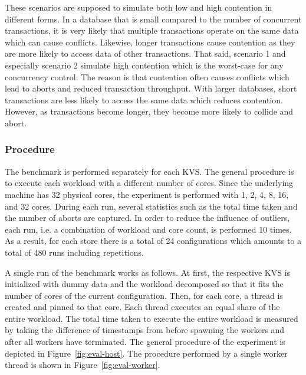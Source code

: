 These scenarios are supposed to simulate both low and high contention in
different forms. In a database that is small compared to the number of
concurrent transactions, it is very likely that multiple transactions operate on
the same data which can cause conflicts. Likewise, longer transactions cause
contention as they are more likely to access data of other transactions. That
said, scenario 1 and especially scenario 2 simulate high contention which is the
worst-case for any concurrency control. The reason is that contention often
causes conflicts which lead to aborts and reduced transaction throughput. With
larger databases, short transactions are less likely to access the same data
which reduces contention. However, as transactions become longer, they become
more likely to collide and abort.

\subsubsection{Procedure}

The benchmark is performed separately for each KVS. The general procedure is to
execute each workload with a different number of cores. Since the underlying
machine has 32 physical cores, the experiment is performed with 1, 2, 4, 8, 16,
and 32 cores. During each run, several statistics such as the total time taken
and the number of aborts are captured. In order to reduce the influence of
outliers, each run, i.e. a combination of workload and core count, is performed
10 times. As a result, for each store there is a total of 24 configurations
which amounts to a total of 480 runs including repetitions.

A single run of the benchmark works as follows. At first, the respective KVS is
initialized with dummy data and the workload decomposed so that it fits the
number of cores of the current configuration. Then, for each core, a thread is
created and pinned to that core. Each thread executes an equal share of the
entire workload. The total time taken to execute the entire workload is measured
by taking the difference of timestamps from before spawning the workers and
after all workers have terminated. The general procedure of the experiment is
depicted in Figure~\ref{fig:eval-host}. The procedure performed by a single
worker thread is shown in Figure~\ref{fig:eval-worker}.



